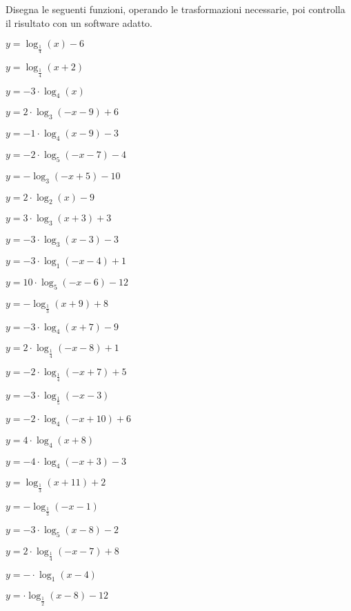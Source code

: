 \begin{esercizio}\label{ese:}
 Disegna le seguenti funzioni, operando le trasformazioni necessarie, poi 
controlla il risultato con un software adatto.
\begin{multicols}{2}
 \begin{enumeratea}
  \item  \(y=  \log_{\frac{1}{4}}\left(x \right) -6\)
  \item  \(y=  \log_{\frac{1}{4}}\left(x+2\right)\)
  \item  \(y=-3 \cdot \log_{4}\left(x\right)\)
  \item  \(y= 2 \cdot \log_{3}\left(-x-9\right) +6\)
  \item  \(y=-1 \cdot \log_{4}\left(x-9\right) -3\)
  \item  \(y=-2 \cdot \log_{5}\left(-x-7\right) -4\)
  \item  \(y= - \log_{3}\left(-x+5\right) -10\)
  \item  \(y= 2 \cdot \log_{2}\left(x \right) -9\)
  \item  \(y= 3 \cdot \log_{3}\left(x+3\right) +3\)
  \item  \(y= -3 \cdot \log_{3}\left(x-3\right) -3\)
  \item  \(y= -3 \cdot \log_{1}\left(-x-4\right) +1\)
  \item  \(y= 10 \cdot \log_{5}\left(-x-6\right) -12\)
  \item  \(y= - \log_{\frac{1}{3}}\left(x+9\right) +8\)
  \item  \(y= -3 \cdot \log_{4}\left(x+7\right) -9\)
  \item  \(y= 2 \cdot \log_{\frac{1}{4}}\left(-x-8\right) +1\)
  \item  \(y= -2 \cdot \log_{\frac{1}{4}}\left(-x+7\right) +5\)
  \item  \(y= -3 \cdot \log_{\frac{1}{5}}\left(-x-3\right) \)
  \item  \(y= -2 \cdot \log_{4}\left(-x+10\right) +6\)
  \item  \(y= 4 \cdot \log_{4}\left(x+8\right) \)
  \item  \(y= -4 \cdot \log_{4}\left(-x+3\right) -3\)
  \item  \(y= \log_{\frac{1}{3}}\left(x+11\right) +2\)
  \item  \(y= - \log_{\frac{1}{3}}\left(-x-1\right) \)
  \item  \(y= -3 \cdot \log_{5}\left(x-8\right) -2\)
  \item  \(y= 2 \cdot \log_{\frac{1}{4}}\left(-x-7\right) +8\)
  \item  \(y= - \cdot \log_{1}\left(x-4\right) \)
  \item  \(y=  \cdot \log_{\frac{1}{2}}\left(x-8\right) -12\)
 \end{enumeratea}
\end{multicols}
\end{esercizio}


